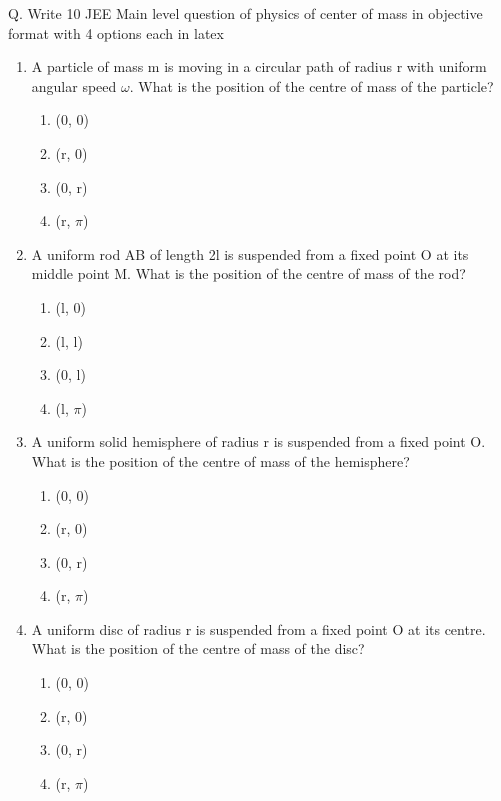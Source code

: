 Q. Write 10 JEE Main level question of physics of center of mass in objective format with 4 options each in latex

\begin{enumerate}
    \item A particle of mass m is moving in a circular path of radius r with uniform angular speed $\omega$. What is the position of the centre of mass of the particle?

\begin{enumerate}
    \item (0, 0)
    \item (r, 0)
    \item (0, r)
    \item (r, $\pi$)
\end{enumerate}

\item A uniform rod AB of length 2l is suspended from a fixed point O at its middle point M. What is the position of the centre of mass of the rod?

\begin{enumerate}
    \item (l, 0)
    \item (l, l)
    \item (0, l)
    \item (l, $\pi$)
\end{enumerate}

\item A uniform solid hemisphere of radius r is suspended from a fixed point O. What is the position of the centre of mass of the hemisphere?

\begin{enumerate}
    \item (0, 0)
    \item (r, 0)
    \item (0, r)
    \item (r, $\pi$)
\end{enumerate}

\item A uniform disc of radius r is suspended from a fixed point O at its centre. What is the position of the centre of mass of the disc?

\begin{enumerate}
    \item (0, 0)
    \item (r, 0)
    \item (0, r)
    \item (r, $\pi$)
\end{enumerate}


\end{enumerate}
